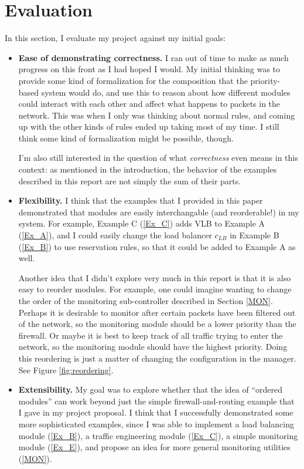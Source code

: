 \documentclass{article}
\begin{document}
\section{Evaluation} \label{EVA}

In this section, I evaluate my project against my initial goals:

\begin{itemize}
\item \textbf{Ease of demonstrating correctness.} 
I ran out of time to make as much progress on this front as I had hoped I would.
My initial thinking was to provide some kind of formalization for the 
composition that the priority-based system would do, and use this to reason
about how different modules could interact with each other and affect
what happens to packets in the network.
This was when I only was thinking about normal rules, and coming up with the
other kinds of rules ended up taking most of my time. 
I still think some kind of formalization might be possible, though.

I'm also still interested in the question of what \emph{correctness} even 
means in this context: as mentioned in the introduction, the behavior of 
the examples described in this report are not simply the sum of their parts.

\item \textbf{Flexibility.}
I think that the examples that I provided in this paper demonstrated that
modules are easily interchangable (and reorderable!) in my system.
For example, Example C (\ref{Ex_C}) adds VLB to Example A (\ref{Ex_A}), 
and I could easily change the load balancer $c_{LB}$ in Example B (\ref{Ex_B})
to use reservation rules, so that it could be added to Example A as well.

Another idea that I didn't explore very much in this report is that it is also
easy to reorder modules. 
For example, one could imagine wanting to change the order of
the monitoring sub-controller described in Section \ref{MON}.
Perhaps it is desirable to monitor after certain packets have been filtered
out of the network, so the monitoring module should be a lower priority than
the firewall.
Or maybe it is best to keep track of all traffic trying to enter the network,
so the monitoring module should have the highest priority.
Doing this reordering is just a matter of changing the configuration in the
manager. See Figure \ref{fig:reordering}.

\item \textbf{Extensibility.}
My goal was to explore whether that the idea of ``ordered modules'' can work
beyond just the simple firewall-and-routing example that I gave in my project
proposal.
I think that I successfully demonstrated some more sophisticated examples, 
since I was able to implement a load balancing module (\ref{Ex_B}), 
a traffic engineering module (\ref{Ex_C}), a simple monitoring module (\ref{Ex_E}), 
and propose an idea for more general monitoring utilities (\ref{MON}).


\end{itemize}
\end{document}
